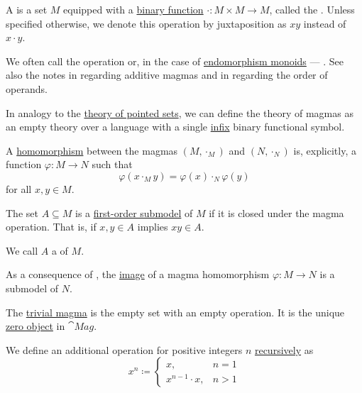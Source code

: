\begin{definition}\label{def:magma}
  A  is a set \( M \) equipped with a \hyperref[def:multi_valued_function/arguments]{binary function} \( \cdot: M \times M \to M \), called the . Unless specified otherwise, we denote this operation by juxtaposition as \( xy \) instead of \( x \cdot y \).

  We often call the operation  or, in the case of \hyperref[def:endomorphism_monoid]{endomorphism monoids} --- . See also the notes in  regarding additive magmas and in  regarding the order of operands.

  \begin{thmenum}[series=def:magma]
     In analogy to the \hyperref[def:pointed_set/theory]{theory of pointed sets}, we can define the theory of magmas as an empty theory over a language with a single \hyperref[rem:first_order_formula_conventions/infix]{infix} binary functional symbol.

     A \hyperref[def:first_order_homomorphism]{homomorphism} between the magmas \( (M, \cdot_{M}) \) and \( (N, \cdot_{N}) \) is, explicitly, a function \( \varphi: M \to N \) such that
    \begin{equation}\label{eq:def:magma/homomorphism}
      \varphi(x \cdot_{M} y) = \varphi(x) \cdot_{N} \varphi(y)
    \end{equation}
    for all \( x, y \in M \).

     The set \( A \subseteq M \) is a \hyperref[def:first_order_substructure]{first-order submodel} of \( M \) if it is closed under the magma operation. That is, if \( x, y \in A \) implies \( xy \in A \).

    We call \( A \) a  of \( M \).

    As a consequence of , the \hyperref[def:multi_valued_function/image]{image} of a magma homomorphism \( \varphi: M \to N \) is a submodel of \( N \).

     The \hyperref[thm:substructures_form_complete_lattice/bottom]{trivial magma} is the empty set with an empty operation. It is the unique \hyperref[def:universal_objects/initial]{zero object} in \( \cat{Mag} \).

     We define an additional  operation for positive integers \( n \) \hyperref[rem:natural_number_recursion]{recursively} as
    \begin{equation}\label{eq:def:magma/exponentiation}
      x^n \coloneqq \begin{cases}
        x,               &n = 1 \\
        x^{n-1} \cdot x, &n > 1
      \end{cases}
    \end{equation}


\end{thmenum}
\end{definition}
